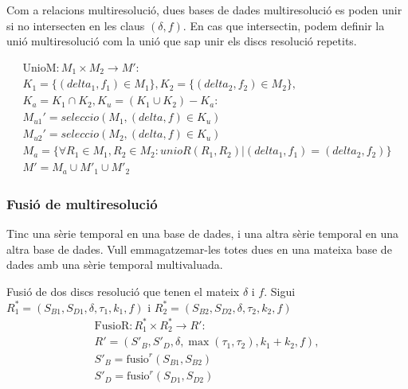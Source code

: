 Com a relacions multiresolució, dues bases de dades multiresolució es
poden unir si no intersecten en les claus $(\delta,f)$.  En cas que
intersectin, podem definir la unió multiresolució com la unió que sap unir els discs resolució repetits.

\begin{gather*}
    \text{UnioM}: M_1 \times M_2 \longrightarrow M': \\
    K_1 = \{(delta_1,f_1) \in M_1\},K_2 = \{(delta_2,f_2) \in M_2\}, \\
    K_a = K_1 \cap K_2, K_u =  (K_1 \cup K_2) - K_a : \\
    M_{u1}'= seleccio(M_1, (delta,f) \in K_u)\\
    M_{u2}'= seleccio(M_2, (delta,f) \in K_u)\\
    M_a = \{\forall R_1\in M_1,R_2\in M_2: unioR(R_1,R_2) |
       (delta_1,f_1) = (delta_2,f_2) \} \\
    M' =  M_{a} \cup  M'_{1}  \cup  M'_{2}     
\end{gather*}






\subsubsection{Fusió de multiresolució}

Tinc una sèrie temporal en una base de dades, i una altra sèrie temporal en una altra base de dades. Vull emmagatzemar-les totes dues en una mateixa base de dades amb una sèrie temporal multivaluada.


Fusió de dos discs resolució que tenen el mateix $\delta$ i $f$.
Sigui $R_1^*=(S_{B1},S_{D1},\delta,\tau_1,k_1,f)$ i
$R_2^*=(S_{B2},S_{D2},\delta,\tau_2,k_2,f)$
  \begin{gather*}
    \text{FusioR}: R_1^* \times R_2^* \longrightarrow R': \\
    R' = (S'_B,S'_D,\delta,\max(\tau_1,\tau_2),k_1+k_2,f), \\
    S'_B = \text{fusio}^r(S_{B1},S_{B2})\\
    S'_D = \text{fusio}^r(S_{D1},S_{D2})
\end{gather*}


